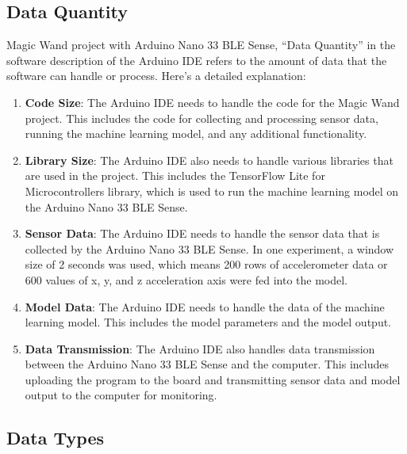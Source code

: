 \subsection{Data Quantity}
Magic Wand project with Arduino Nano 33 BLE Sense, “Data Quantity” in the software description of the Arduino IDE refers to the amount of data that the software can handle or process. Here’s a detailed explanation:
\begin{enumerate}
    \item \textbf{Code Size}: The Arduino IDE needs to handle the code for the Magic Wand project. This includes the code for collecting and processing sensor data, running the machine learning model, and any additional functionality.
    
    \item \textbf{Library Size}: The Arduino IDE also needs to handle various libraries that are used in the project. This includes the TensorFlow Lite for Microcontrollers library, which is used to run the machine learning model on the Arduino Nano 33 BLE Sense.
    
    \item \textbf{Sensor Data}: The Arduino IDE needs to handle the sensor data that is collected by the Arduino Nano 33 BLE Sense. In one experiment, a window size of 2 seconds was used, which means 200 rows of accelerometer data or 600 values of x, y, and z acceleration axis were fed into the model.\cite{Fezari:2018}
    
    \item \textbf{Model Data}: The Arduino IDE needs to handle the data of the machine learning model. This includes the model parameters and the model output.
    
    \item \textbf{Data Transmission}: The Arduino IDE also handles data transmission between the Arduino Nano 33 BLE Sense and the computer. This includes uploading the program to the board and transmitting sensor data and model output to the computer for monitoring.
\end{enumerate}

\subsection{Data Types}

